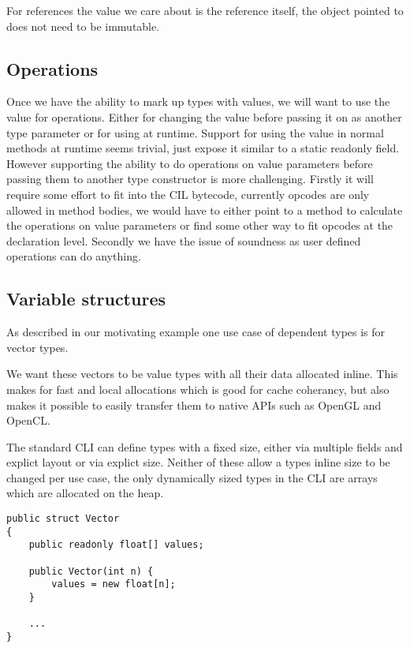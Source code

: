 For references the value we care about is the reference itself, the object pointed to does not need to be immutable.

\subsection{Operations}

Once we have the ability to mark up types with values, we will want
to use the value for operations. Either for changing the value before
passing it on as another type parameter or for using at runtime. Support
for using the value in normal methods at runtime seems trivial, just
expose it similar to a static readonly field. However supporting the
ability to do operations on value parameters before passing them to
another type constructor is more challenging. Firstly it will require
some effort to fit into the CIL bytecode, currently opcodes are only
allowed in method bodies, we would have to either point to a method
to calculate the operations on value parameters or find some other
way to fit opcodes at the declaration level. Secondly we have the
issue of soundness as user defined operations can do anything.

\subsection{Variable structures}

As described in our motivating example one use case of dependent types is for vector types.

We want these vectors to be value types with all their data allocated inline. This makes for fast and local
allocations which is good for cache coherancy, but also makes it possible to easily transfer them to native
APIs such as OpenGL and OpenCL.

The standard CLI can define types with a fixed size, either via multiple fields and explict layout or via explict size.
Neither of these allow a types inline size to be changed per use case, the only dynamically sized types in the CLI are
arrays which are allocated on the heap.

\begin{lstlisting}[caption={Vector using CLI array}, keywordstyle={\color{blue}},language=sharpc]
public struct Vector
{
	public readonly float[] values;
	
	public Vector(int n) {
		values = new float[n];
	}
	
	...
}
\end{lstlisting}

